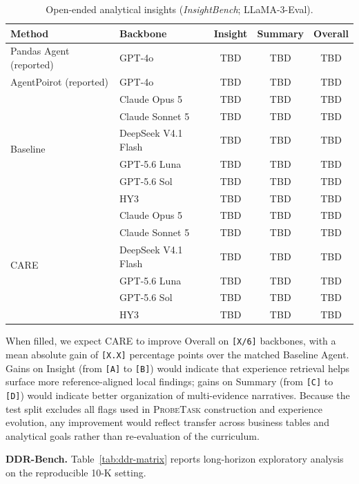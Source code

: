\documentclass{article}
\newcommand{\method}{\textsc{CARE}}
\newcommand{\probe}{\textsc{ProbeTask}}
\begin{document}
\begin{table}[t]
  \caption{Open-ended analytical insights (\textit{InsightBench}; LLaMA-3-Eval).}
  \label{tab:insightbench-matrix}
  \centering
  \scriptsize
  \begin{tabular}{llccc}
    \toprule
    Method & Backbone & Insight & Summary & Overall \\
    \midrule
    Pandas Agent (reported) & GPT-4o & TBD & TBD & TBD \\
    AgentPoirot (reported)  & GPT-4o & TBD & TBD & TBD \\
    \midrule
    \multirow{6}{*}{Baseline}
      & Claude Opus 5 & TBD & TBD & TBD \\
      & Claude Sonnet 5 & TBD & TBD & TBD \\
      & DeepSeek V4.1 Flash & TBD & TBD & TBD \\
      & GPT-5.6 Luna & TBD & TBD & TBD \\
      & GPT-5.6 Sol & TBD & TBD & TBD \\
      & HY3 & TBD & TBD & TBD \\
    \midrule
    \multirow{6}{*}{\method{}}
      & Claude Opus 5 & TBD & TBD & TBD \\
      & Claude Sonnet 5 & TBD & TBD & TBD \\
      & DeepSeek V4.1 Flash & TBD & TBD & TBD \\
      & GPT-5.6 Luna & TBD & TBD & TBD \\
      & GPT-5.6 Sol & TBD & TBD & TBD \\
      & HY3 & TBD & TBD & TBD \\
    \bottomrule
  \end{tabular}
\end{table}

When filled, we expect \method{} to improve Overall on \texttt{[X/6]} backbones, with a mean absolute gain of \texttt{[X.X]} percentage points over the matched Baseline Agent.
Gains on Insight (from \texttt{[A]} to \texttt{[B]}) would indicate that experience retrieval helps surface more reference-aligned local findings; gains on Summary (from \texttt{[C]} to \texttt{[D]}) would indicate better organization of multi-evidence narratives.
Because the test split excludes all flags used in \probe{} construction and experience evolution, any improvement would reflect transfer across business tables and analytical goals rather than re-evaluation of the curriculum.

\noindent\textbf{DDR-Bench.} Table~\ref{tab:ddr-matrix} reports long-horizon exploratory analysis on the reproducible 10-K setting.
\end{document}
